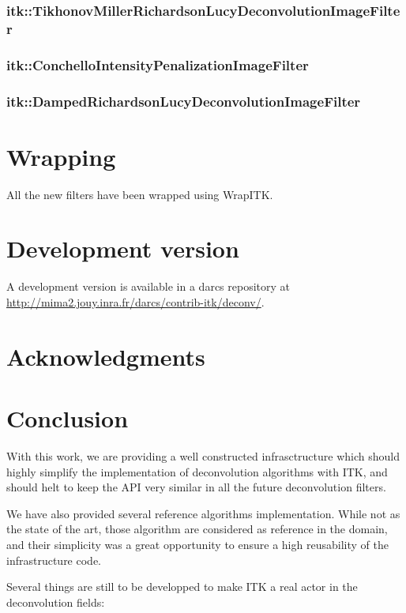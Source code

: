 \documentclass{InsightArticle}
\begin{document}
\subsubsection{itk::TikhonovMillerRichardsonLucyDeconvolutionImageFilter}
\subsubsection{itk::ConchelloIntensityPenalizationImageFilter}
\subsubsection{itk::DampedRichardsonLucyDeconvolutionImageFilter}

\section{Wrapping}

All the new filters have been wrapped using WrapITK.

\section{Development version}

A development version is available in a darcs repository at
\url{http://mima2.jouy.inra.fr/darcs/contrib-itk/deconv/}.

\section{Acknowledgments}


\section{Conclusion}

With this work, we are providing a well constructed infrasctructure which should highly simplify the implementation
of deconvolution algorithms with ITK, and should helt to keep the API very similar in all the future deconvolution filters.

We have also provided several reference algorithms implementation. While not as the state of the art, those algorithm are
considered as reference in the domain, and their simplicity was a great opportunity to ensure a high reusability of the
infrastructure code.

Several things are still to be developped to make ITK a real actor in the deconvolution fields:
\end{document}
